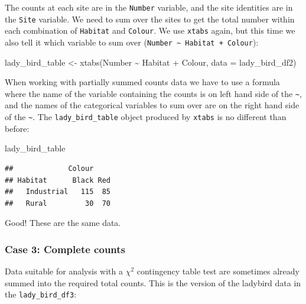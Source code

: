 \documentclass[
]{book}
\newenvironment{Shaded}{\begin{snugshade}}{\end{snugshade}}
\newcommand{\AttributeTok}[1]{\textcolor[rgb]{0.77,0.63,0.00}{#1}}
\newcommand{\FunctionTok}[1]{\textcolor[rgb]{0.00,0.00,0.00}{#1}}
\newcommand{\NormalTok}[1]{#1}
\newcommand{\OtherTok}[1]{\textcolor[rgb]{0.56,0.35,0.01}{#1}}
\newcommand{\SpecialCharTok}[1]{\textcolor[rgb]{0.00,0.00,0.00}{#1}}
\begin{document}
The counts at each site are in the \texttt{Number} variable, and the site identities are in the \texttt{Site} variable. We need to sum over the sites to get the total number within each combination of \texttt{Habitat} and \texttt{Colour}. We use \texttt{xtabs} again, but this time we also tell it which variable to sum over (\texttt{Number\ \textasciitilde{}\ Habitat\ +\ Colour}):

\begin{Shaded}
\begin{Highlighting}[]
\NormalTok{lady\_bird\_table }\OtherTok{\textless{}{-}} \FunctionTok{xtabs}\NormalTok{(Number }\SpecialCharTok{\textasciitilde{}}\NormalTok{ Habitat }\SpecialCharTok{+}\NormalTok{ Colour, }\AttributeTok{data =}\NormalTok{ lady\_bird\_df2)}
\end{Highlighting}
\end{Shaded}

When working with partially summed counts data we have to use a formula where the name of the variable containing the counts is on left hand side of the \texttt{\textasciitilde{}}, and the names of the categorical variables to sum over are on the right hand side of the \texttt{\textasciitilde{}}. The \texttt{lady\_bird\_table} object produced by \texttt{xtabs} is no different than before:

\begin{Shaded}
\begin{Highlighting}[]
\NormalTok{lady\_bird\_table}
\end{Highlighting}
\end{Shaded}

\begin{verbatim}
##             Colour
## Habitat      Black Red
##   Industrial   115  85
##   Rural         30  70
\end{verbatim}

Good! These are the same data.

\hypertarget{case-3-complete-counts}{%
\subsubsection{\texorpdfstring{\textbf{Case 3: Complete counts}}{Case 3: Complete counts}}\label{case-3-complete-counts}}

Data suitable for analysis with a \(\chi^{2}\) contingency table test are sometimes already summed into the required total counts. This is the version of the ladybird data in the \texttt{lady\_bird\_df3}:
\end{document}
